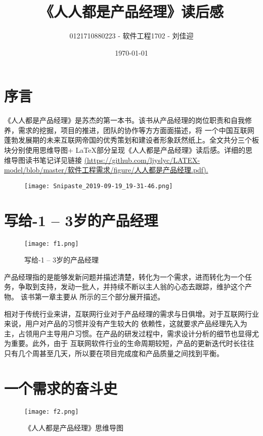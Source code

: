\documentclass[lang=cn,11pt,numbers]{elegantpaper}
\title{《人人都是产品经理》读后感}
\author{0121710880223 - 软件工程1702 - 刘佳迎}
\date{\today}
\begin{document}
\maketitle

\section{序言}

《人人都是产品经理》是苏杰的第一本书。该书从产品经理的岗位职责和自我修养，需求的挖掘，项目的推进，团队的协作等方方面面描述，将
一个中国互联网蓬勃发展期的未来互联网帝国的优秀策划和建设者形象跃然纸上。全文共分三个板块分别使用思维导图+ \LaTeX 部分呈现《人人都是产品经理》读后感。详细的思维导图读书笔记详见链接
\href{https://github.com/ljyslyc/LATEX-model/blob/master/软件工程需求/figure/人人都是产品经理.pdf}{(https://github.com/ljyslyc/LATEX-model/blob/master/软件工程需求/figure/人人都是产品经理.pdf).} 
\begin{figure}[H]
	\centering
	\texttt{[image: Snipaste\_2019-09-19\_19-31-46.png]}
\end{figure}


\section{写给-1 -- 3岁的产品经理}

\begin{figure}[H]
	\centering
	\texttt{[image: f1.png]}
	\caption{ 写给-1 -- 3岁的产品经理 \label{fig:2}}
\end{figure}
产品经理指的是能够发新问题并描述清楚，转化为一个需求，进而转化为一个任务，争取到支持，发动一批人，并持续不断以主人翁的心态去跟踪，维护这个产物。
该书第一章主要从 所示的三个部分展开描述。

相对于传统行业来讲，互联网行业对于产品经理的需求与日俱增。对于互联网行业来说，用户对产品的习惯并没有产生较大的
依赖性，这就要求产品经理先入为主，占领用户主导用户习惯。在产品的研发过程中，需求设计分析的细节也显得尤为重要。此外，由于
互联网软件行业的生命周期较短，产品的更新迭代时长往往只有几个周甚至几天，所以要在项目完成度和产品质量之间找到平衡。




\section{一个需求的奋斗史}

\begin{figure}[H]
	\centering
	\texttt{[image: f2.png]}
	\caption{ 《人人都是产品经理》思维导图 \label{fig:3}}
\end{figure}
\end{document}
